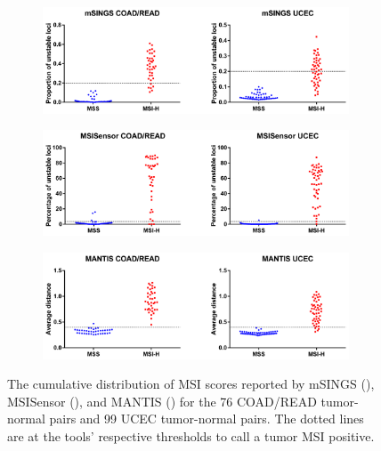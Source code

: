 \begin{figure}[htp]
    \centering
    \begin{subfigure}{0.8\textwidth}
        \includegraphics[width=\textwidth,keepaspectratio]{images/msilandscape/perf_coadread_ucec_msings}
        \caption{}\label{fig:msilandscape:perf_coadread_ucec_msings}
    \end{subfigure}\par
    \begin{subfigure}{0.8\textwidth}
        \includegraphics[width=\textwidth,keepaspectratio]{images/msilandscape/perf_coadread_ucec_msisensor}
        \caption{}\label{fig:msilandscape:perf_coadread_ucec_msisensor}
    \end{subfigure}\par
    \begin{subfigure}{0.8\textwidth}
        \includegraphics[width=\textwidth,keepaspectratio]{images/msilandscape/perf_coadread_ucec_mantis}
        \caption{}\label{fig:msilandscape:perf_coadread_ucec_mantis}
    \end{subfigure}
    \caption[Distribution of MSI scores from all three tools in COAD/READ and UCEC.]{The cumulative distribution of MSI scores reported by mSINGS (), MSISensor (), and MANTIS () for the 76 COAD/READ tumor-normal pairs and 99 UCEC tumor-normal pairs. The dotted lines are at the tools' respective thresholds to call a tumor MSI positive.}
    \label{fig:msilandscape:perf_coadread_ucec}
\end{figure}
